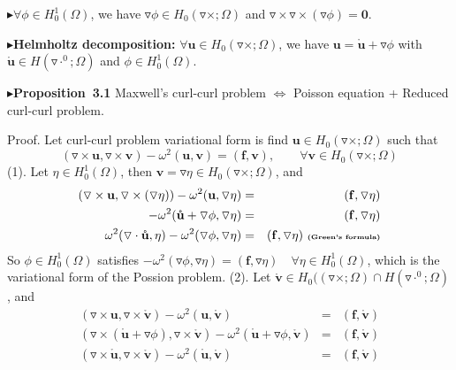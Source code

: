 \documentclass[a4paper,11pt]{article}
\begin{document}
$\blacktriangleright$\indent$\forall \phi\in H_{0}^{1}(\Omega)$, we have $\triangledown\phi\in H_0(\triangledown\times;\Omega)$ and $ \triangledown\times\triangledown\times(\triangledown\phi) = \mathbf{0}$.

$\blacktriangleright$\textbf{Helmholtz decomposition:} $\forall \mathbf{u}\in H_0(\triangledown\times;\Omega)$, we have $\mathbf{u} = \mathring{\mathbf{u}} + \triangledown \phi$ with $\mathring{\mathbf{u}}\in H(\triangledown\cdot^0;\Omega)$ and $\phi \in H_{0}^{1}(\Omega)$.

$\blacktriangleright$\textbf{Proposition\ 3.1} Maxwell's curl-curl problem $\Leftrightarrow$ Poisson equation + Reduced curl-curl problem.

Proof. Let curl-curl problem variational form is find $\mathbf{u}\in H_0(\triangledown\times;\Omega)$ such that
\[(\triangledown\times\mathbf{u} , \triangledown\times\mathbf{v}) - \omega^{2}(\mathbf{u},\mathbf{v}) = (\mathbf{f} , \mathbf{v}),\qquad \forall\mathbf{v}\in H_0(\triangledown\times;\Omega)\]
(1). Let $\eta\in H_{0}^{1}(\Omega)$, then $\mathbf{v} = \triangledown\eta\in H_0(\triangledown\times;\Omega)$, and
\begin{eqnarray}
\nonumber
(\triangledown\times\mathbf{u} , \triangledown\times(\triangledown\eta)) - \omega^{2}(\mathbf{u},\triangledown\eta)
 & = & (\mathbf{f} , \triangledown\eta) \\ \nonumber
- \omega^{2}(\mathring{\mathbf{u}} + \triangledown{\phi},\triangledown\eta) & = & (\mathbf{f} , \triangledown\eta) \\ \nonumber
\omega^{2}(\triangledown\cdot\mathring{\mathbf{u}},\eta) - \omega^{2}(\triangledown{\phi},\triangledown\eta) & = & (\mathbf{f} , \triangledown\eta) \ \textbf{\tiny{(Green's formula)}}
\end{eqnarray}
So $\phi\in H_{0}^{1}(\Omega)$ satisfies $- \omega^{2}(\triangledown{\phi},\triangledown\eta) =  (\mathbf{f},\triangledown\eta)\quad \forall\eta\in H_0^1(\Omega)$, which is the variational form of the Possion problem.\newline
(2). Let $\mathring{\mathbf{v}}\in H_0((\triangledown\times;\Omega)\cap H(\triangledown\cdot^0;\Omega)$, and
\begin{eqnarray}
\nonumber
(\triangledown\times\mathbf{u} , \triangledown\times\mathring{\mathbf{v}}) - \omega^{2}(\mathbf{u},\mathring{\mathbf{v}})
 & = & (\mathbf{f} , \mathring{\mathbf{v}}) \\ \nonumber
(\triangledown\times(\mathring{\mathbf{u}} + \triangledown{\phi}) , \triangledown\times\mathring{\mathbf{v}}) - \omega^{2}(\mathring{\mathbf{u}} + \triangledown{\phi},\mathring{\mathbf{v}})
 & = & (\mathbf{f} , \mathring{\mathbf{v}}) \\ \nonumber
(\triangledown\times\mathring{\mathbf{u}} , \triangledown\times\mathring{\mathbf{v}}) - \omega^{2}(\mathring{\mathbf{u}},\mathring{\mathbf{v}})
 & = & (\mathbf{f} , \mathring{\mathbf{v}})
\end{eqnarray}
\end{document}
